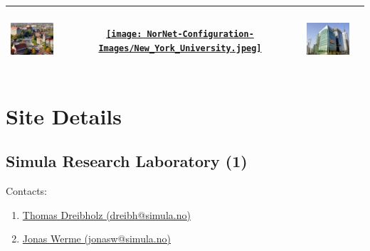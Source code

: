 \begin{small}
\begin{center}
\begin{longtable}{|c|c|c|c|}
 \hyperref[sec:KU]{\includegraphics[keepaspectratio,width=9em,height=6em]{NorNet-Configuration-Images/The_University_of_Kansas.jpeg}} & \hyperref[sec:NYU]{\texttt{[image: NorNet-Configuration-Images/New\_York\_University.jpeg]}} & \hyperref[sec:BLS]{\includegraphics[keepaspectratio,width=9em,height=6em]{NorNet-Configuration-Images/Bell_Labs_Seoul.jpeg}} &  \\ \hline
\end{longtable}
\end{center}
\end{small}




\chapter{Site Details}
\label{cha:Site-Details}




\section{Simula Research Laboratory (1)}
\label{sec:SRL}

Contacts:
\begin{enumerate}
 \item {}\href{mailto:dreibh@simula.no}{Thomas Dreibholz (dreibh@simula.no)}
 \item {}\href{mailto:jonasw@simula.no}{Jonas Werme (jonasw@simula.no)}
\end{enumerate}

